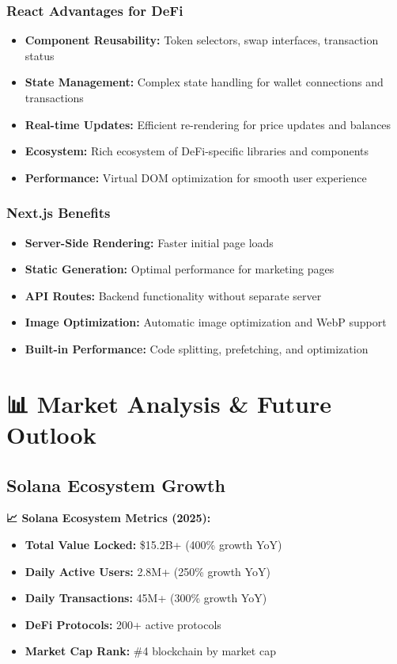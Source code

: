 \documentclass[11pt,a4paper]{article}
\begin{document}
\subsubsection{React Advantages for DeFi}

\begin{itemize}
    \item \textbf{Component Reusability:} Token selectors, swap interfaces, transaction status
    \item \textbf{State Management:} Complex state handling for wallet connections and transactions
    \item \textbf{Real-time Updates:} Efficient re-rendering for price updates and balances
    \item \textbf{Ecosystem:} Rich ecosystem of DeFi-specific libraries and components
    \item \textbf{Performance:} Virtual DOM optimization for smooth user experience
\end{itemize}

\subsubsection{Next.js Benefits}

\begin{itemize}
    \item \textbf{Server-Side Rendering:} Faster initial page loads
    \item \textbf{Static Generation:} Optimal performance for marketing pages
    \item \textbf{API Routes:} Backend functionality without separate server
    \item \textbf{Image Optimization:} Automatic image optimization and WebP support
    \item \textbf{Built-in Performance:} Code splitting, prefetching, and optimization
\end{itemize}

\section{📊 Market Analysis \& Future Outlook}

\subsection{Solana Ecosystem Growth}

\begin{tcolorbox}[colback=solanaGreen!10,colframe=solanaGreen]
\textbf{📈 Solana Ecosystem Metrics (2025):}
\begin{itemize}
    \item \textbf{Total Value Locked:} \$15.2B+ (400\% growth YoY)
    \item \textbf{Daily Active Users:} 2.8M+ (250\% growth YoY)
    \item \textbf{Daily Transactions:} 45M+ (300\% growth YoY)
    \item \textbf{DeFi Protocols:} 200+ active protocols
    \item \textbf{Market Cap Rank:} \#4 blockchain by market cap
\end{itemize}
\end{tcolorbox}
\end{document}
